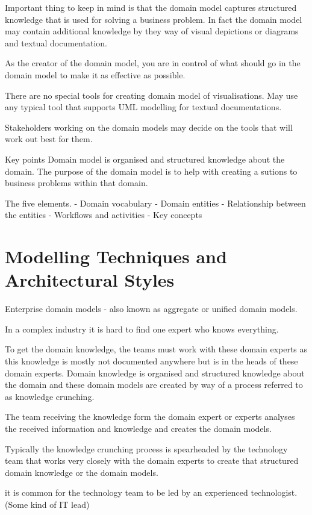 Important thing to keep in mind is that the domain model captures structured knowledge that is used for solving a business problem.
In fact the domain model may contain additional knowledge by they way of visual depictions or diagrams and textual documentation.

As the creator of the domain model, you are in control of what should go in the domain model to make it as effective as possible.

There are no special tools for creating domain model of visualisations.
May use any typical tool that supports UML modelling for textual documentations.

Stakeholders working on the domain models may decide on the tools that will work out best for them.

Key points
Domain model is organised and structured knowledge about the domain.
The purpose of the domain model is to help with creating a sutions to business problems within that domain.

The five elements.
- Domain vocabulary
- Domain entities
- Relationship between the entities
- Workflows and activities
- Key concepts

\section{Modelling Techniques and Architectural Styles}
Enterprise domain models  - also known as aggregate or unified domain models.

In a complex industry it is hard to find one expert who knows everything.

To get the domain knowledge, the teams must work with these domain experts as this knowledge is mostly not documented anywhere but is in the heads of these domain experts.
Domain knowledge is organised and structured knowledge about the domain and these domain models are created by way of a process referred to as knowledge crunching.

The team receiving the knowledge form the domain expert or experts analyses the received information and knowledge and creates the domain models.

Typically the knowledge crunching process is spearheaded by the technology team that works very closely with the domain experts to create that structured domain knowledge or the domain models.

it is common for the technology team to be led by an experienced technologist. (Some kind of IT lead)

